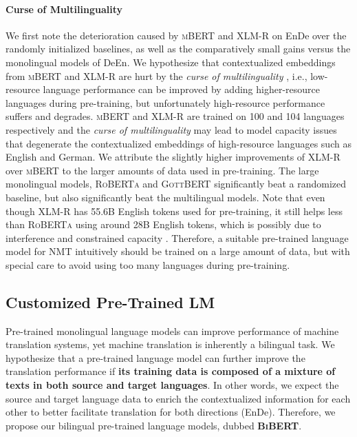 \documentclass[11pt]{article}
\begin{document}
\paragraph{Curse of Multilinguality}
We first note the deterioration caused by \textsc{mBERT} and \textsc{XLM-R} on EnDe over the randomly initialized baselines, as well as the comparatively small gains versus the monolingual models of DeEn. We hypothesize that contextualized embeddings from \textsc{mBERT} and \textsc{XLM-R} are hurt by the \textit{curse of multilinguality} \citep{conneau2020unsupervised}, i.e., low-resource language performance can be improved by adding higher-resource languages during pre-training, but unfortunately high-resource performance suffers and degrades. \textsc{mBERT} and \textsc{XLM-R} are trained on 100 and 104 languages respectively and the \textit{curse of multilinguality} may lead to model capacity issues that degenerate the contextualized embeddings of high-resource languages such as English and German. We attribute the slightly higher improvements of \textsc{XLM-R} over \textsc{mBERT} to the larger amounts of data used in pre-training. The large monolingual models, \textsc{RoBERTa} and \textsc{GottBERT} significantly beat a randomized baseline, but also significantly beat the multilingual models. Note that even though \textsc{XLM-R} has 55.6B English tokens used for pre-training, it still helps less than \textsc{RoBERTa} using around 28B English tokens, which is possibly due to interference and constrained capacity \citep{arivazhagan2019massively, johnson2017google, tan2019multilingual}. Therefore, a suitable pre-trained language model for NMT intuitively should be trained on a large amount of data, but with special care to avoid using too many languages during pre-training. 



\subsection{Customized Pre-Trained LM}
Pre-trained monolingual language models can improve performance of machine translation systems, yet machine translation is inherently a bilingual task. 
We hypothesize that a pre-trained language model can further improve the translation performance if \textbf{its training data is composed of a mixture of texts in both source and target languages}. In other words, we expect the source and target language data to enrich the contextualized information for each other to better facilitate translation for both directions (EnDe). Therefore, we propose our bilingual pre-trained language models, dubbed \textbf{\textsc{BiBERT}}. 
\end{document}
